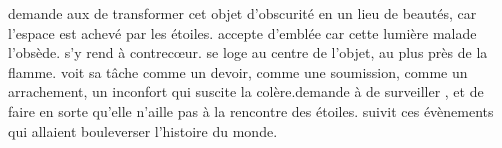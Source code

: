 \Cind demande aux \Ea de transformer cet objet d'obscurité en un lieu de beautés, car l'espace est achevé par les étoiles. \Oros accepte d'emblée car cette lumière malade l'obsède. \Nio s'y rend à contrecœur. \Fercor se loge au centre de l'objet, au plus près de la flamme. \Oros voit sa tâche comme un devoir, \Nio comme une soumission, \Fercor comme un arrachement, un inconfort qui suscite la colère.\Cind demande à \Carac de surveiller \Nio, et de faire en sorte qu'elle n'aille pas à la rencontre des étoiles. \Ogo suivit ces évènements qui allaient bouleverser l'histoire du monde.


        




